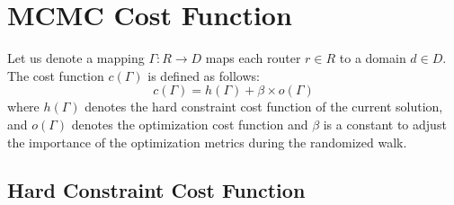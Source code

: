 \section{MCMC Cost Function}
Let us denote a mapping $\Gamma: R \rightarrow D$ maps each 
router $r \in R$ to a domain $d \in D$. The cost function 
$c(\Gamma)$ is defined as follows: 
\begin{equation}
	c(\Gamma) = h(\Gamma) + \beta \times o(\Gamma)
\end{equation}
where $h(\Gamma)$ denotes the hard constraint cost function 
of the current solution, and $o(\Gamma)$ denotes the optimization 
cost function and $\beta$ is a constant to adjust the importance of
the optimization metrics during the randomized walk. 

\subsection{Hard Constraint Cost Function}
